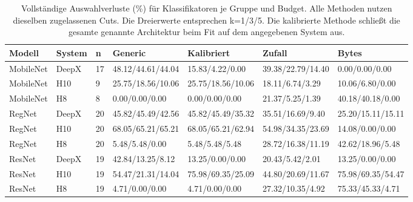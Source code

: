 \begin{table}[t]
\centering
\caption{Vollständige Auswahlverluste (\%) für Klassifikatoren je Gruppe und Budget. Alle Methoden nutzen dieselben zugelassenen Cuts. Die Dreierwerte entsprechen k=1/3/5. Die kalibrierte Methode schließt die gesamte genannte Architektur beim Fit auf dem angegebenen System aus.}
\label{tab:supp-calibration-groups}
\begingroup\small\setlength{\tabcolsep}{3pt}
\begin{tabular}{lllllll}
\toprule
Modell & System & n & Generic & Kalibriert & Zufall & Bytes \\
\midrule
MobileNet & DeepX & 17 & 48.12/44.61/44.04 & 15.83/4.22/0.00 & 39.38/22.79/14.40 & 0.00/0.00/0.00 \\
MobileNet & H10 & 9 & 25.75/18.56/10.06 & 25.75/18.56/10.06 & 18.11/6.74/3.29 & 10.06/6.80/0.00 \\
MobileNet & H8 & 8 & 0.00/0.00/0.00 & 0.00/0.00/0.00 & 21.37/5.25/1.39 & 40.18/40.18/0.00 \\
RegNet & DeepX & 20 & 45.82/45.49/42.56 & 45.82/45.49/35.32 & 35.51/16.69/9.40 & 25.20/15.11/15.11 \\
RegNet & H10 & 20 & 68.05/65.21/65.21 & 68.05/65.21/62.94 & 54.98/34.35/23.69 & 14.08/0.00/0.00 \\
RegNet & H8 & 20 & 5.48/5.48/0.00 & 5.48/5.48/5.48 & 28.72/16.38/11.19 & 42.62/18.96/5.48 \\
ResNet & DeepX & 19 & 42.84/13.25/8.12 & 13.25/0.00/0.00 & 20.43/5.42/2.01 & 13.25/0.00/0.00 \\
ResNet & H10 & 19 & 54.47/21.31/14.04 & 75.98/69.35/25.09 & 44.80/20.69/11.67 & 75.98/69.35/54.47 \\
ResNet & H8 & 19 & 4.71/0.00/0.00 & 4.71/0.00/0.00 & 27.32/10.35/4.92 & 75.33/45.33/4.71 \\
\bottomrule
\end{tabular}
\endgroup
\end{table}
